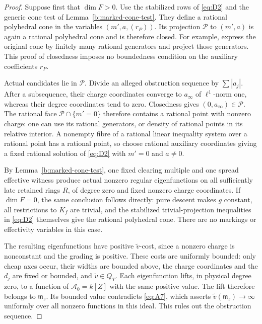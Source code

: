 \begin{proof}
Suppose first that \(\dim F>0\). Use the stabilized rows of
\eqref{eq:D2} and the generic cone test of Lemma~\ref{b:marked-cone-test}.
They define a rational polyhedral cone in the variables \((m',a,(r_P))\).
Its projection \(\mathcal P\) to \((m',a)\) is again a rational
polyhedral cone and is therefore closed. For example, express the
original cone by finitely many rational generators and project those
generators. This proof of closedness imposes no boundedness condition
on the auxiliary coefficients \(r_P\).

Actual candidates lie in \(\mathcal P\). Divide an alleged obstruction
sequence by \(\sum|a_j|\). After a subsequence, their charge coordinates
converge to \(a_\infty\) of \(\ell^1\)-norm one, whereas their degree
coordinates tend to zero. Closedness gives
\((0,a_\infty)\in\mathcal P\). The rational face
\(\mathcal P\cap\{m'=0\}\) therefore contains a rational point with
nonzero charge: one can use its rational generators, or density of
rational points in its relative interior. A nonempty fibre of a rational
linear inequality system over a rational point has a rational point, so
choose rational auxiliary coordinates giving a fixed rational solution
of \eqref{eq:D2} with \(m'=0\) and \(a\ne0\).

By Lemma~\ref{b:marked-cone-test}, one fixed clearing multiple and one
spread effective witness produce actual nonzero regular eigenfunctions
on all sufficiently late retained rings \(R\), of degree zero and fixed
nonzero charge coordinates. If \(\dim F=0\), the same conclusion follows
directly: pure descent makes \(g\) constant, all restrictions to \(K_f\)
are trivial, and the stabilized trivial-projection inequalities in
\eqref{eq:D2} themselves give the rational polyhedral cone. There are no
markings or effectivity variables in this case.

The resulting eigenfunctions have positive \(\tilde v\)-cost, since a
nonzero charge is nonconstant and the grading is positive. These costs
are uniformly bounded: only cheap axes occur, their widths are bounded
above, the charge coordinates and the \(d_j\) are fixed or bounded, and
\(\tilde v\in Q_T\). Each eigenfunction lifts, in physical degree zero,
to a function of \(\mathcal A_0=k[Z]\) with the same positive value.
The lift therefore belongs to \(\mathfrak m_z\). Its bounded value
contradicts \eqref{eq:A7}, which asserts
\(\tilde v(\mathfrak m_z)\to\infty\) uniformly over all nonzero
functions in this ideal. This rules out the obstruction sequence.
\end{proof}

